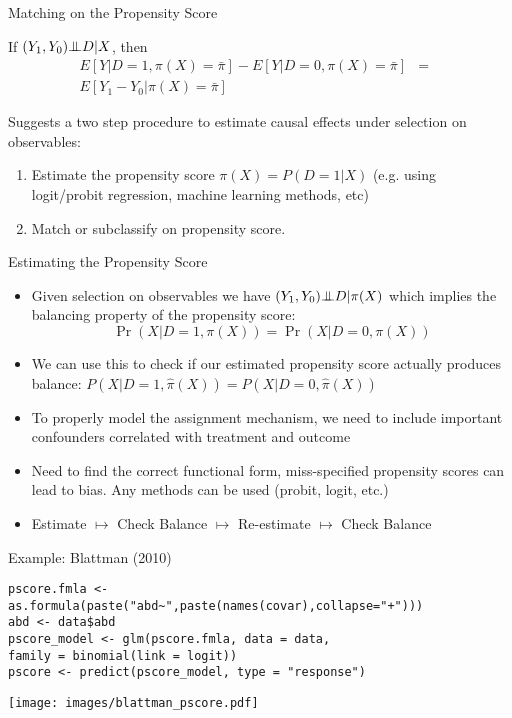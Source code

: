 \documentclass{beamer}
\numberwithin{equation}{section}
\newcommand{\indep}{{\bot\negthickspace\negthickspace\bot}}
\begin{document}
\begin{frame}{Matching on the Propensity Score}

\begin{corollary} If $(Y_1,Y_0) \indep D|X$, then
\begin{eqnarray*}
E[Y|D=1,\pi(X)=\bar{\pi}]-E[Y|D=0,\pi(X)=\bar{\pi}]&=&\\
E[Y_1-Y_0|\pi(X)=\bar{\pi}]
\end{eqnarray*}
\end{corollary}

Suggests a two step procedure to estimate causal effects under selection
on observables:

\begin{enumerate}
\def\labelenumi{\arabic{enumi}.}
\itemsep1pt\parskip0pt
\item
  Estimate the propensity score $\pi(X)=P(D=1|X)$ (e.g. using
  logit/probit regression, machine learning methods, etc) \pause
\item
  Match or subclassify on propensity score.
\end{enumerate}

\end{frame}

\begin{frame}{Estimating the Propensity Score}

\begin{itemize}
\itemsep1pt\parskip0pt
\item
  Given selection on observables we have $(Y_1,Y_0) \indep D|\pi(X)$
  which implies the balancing property of the propensity score: \[
    \Pr(X|D=1,\pi(X))=\Pr(X|D=0,\pi(X))
    \] \pause
\item
  We can use this to check if our estimated propensity score actually
  produces balance:
  $P(X|D=1,\widehat{\pi}(X))=P(X|D=0,\widehat{\pi}(X))$ \pause
\item
  To properly model the assignment mechanism, we need to include
  important confounders correlated with treatment and outcome
\item
  Need to find the correct functional form, miss-specified propensity
  scores can lead to bias. Any methods can be used (probit, logit, etc.)
\item
  Estimate $\mapsto$ Check Balance $\mapsto$ Re-estimate $\mapsto$ Check
  Balance
\end{itemize}

\end{frame}

\begin{frame}[fragile]{Example: Blattman (2010)}

\footnotesize

\begin{verbatim}
pscore.fmla <- as.formula(paste("abd~",paste(names(covar),collapse="+")))
abd <- data$abd
pscore_model <- glm(pscore.fmla, data = data,
family = binomial(link = logit))
pscore <- predict(pscore_model, type = "response")
\end{verbatim}
\centering
\texttt{[image: images/blattman\_pscore.pdf]}

\end{frame}
\end{document}
